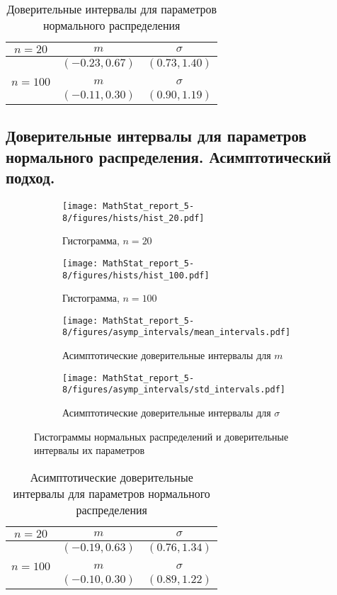\documentclass[12pt]{article}
\begin{document}
	\begin{table}[H]
		\centering
		\begin{tabular}{|c|c|c|} \hline
			$n = 20$ & $m$ & $\sigma$ \\ \hline 
			& $(-0.23,0.67)$ & $(0.73,1.40)$  \\ \hline
			& & \\ \hline
			$n = 100$ & $m$ & $\sigma$ \\ \hline 
			& $(-0.11,0.30)$ & $(0.90,1.19)$ \\ \hline
		\end{tabular}
		\caption{Доверительные интервалы для параметров нормального распределения}
	\end{table}
	
	\subsection{Доверительные интервалы для параметров нормального распределения. Асимптотический подход.}
	
	\begin{figure}[H]
		\centering
		\begin{subfigure}[t]{.45\linewidth}
			\centering\texttt{[image: MathStat\_report\_5-8/figures/hists/hist\_20.pdf]}
			\caption*{Гистограмма, $n=20$}
		\end{subfigure}
		\begin{subfigure}[t]{.45\linewidth}
			\centering\texttt{[image: MathStat\_report\_5-8/figures/hists/hist\_100.pdf]}
			\caption*{Гистограмма, $n=100$}
		\end{subfigure}
		\begin{subfigure}[t]{.45\linewidth}
			\centering\texttt{[image: MathStat\_report\_5-8/figures/asymp\_intervals/mean\_intervals.pdf]}
			\caption*{Асимптотические доверительные интервалы для $m$}
		\end{subfigure}
		\begin{subfigure}[t]{.45\linewidth}
			\centering\texttt{[image: MathStat\_report\_5-8/figures/asymp\_intervals/std\_intervals.pdf]}
			\caption*{Асимптотические доверительные интервалы для $\sigma$}
		\end{subfigure}
		\caption{Гистограммы нормальных распределений и доверительные интервалы их параметров}
	\end{figure}
	
	\begin{table}[H]
		\centering
		\begin{tabular}{|c|c|c|} \hline
			$n = 20$ & $m$ & $\sigma$ \\ \hline 
			& $(-0.19,0.63)$ & $(0.76,1.34)$  \\ \hline
			& & \\ \hline
			$n = 100$ & $m$ & $\sigma$ \\ \hline 
			& $(-0.10,0.30)$ & $(0.89,1.22)$ \\ \hline
		\end{tabular}
		\caption{Асимптотические доверительные интервалы для параметров нормального распределения}
	\end{table}
	
\end{document}
